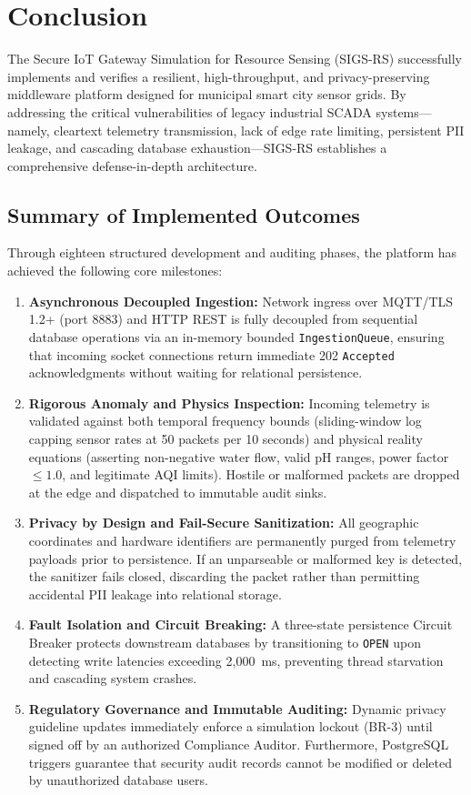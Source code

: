 \section{Conclusion}

The Secure IoT Gateway Simulation for Resource Sensing (SIGS-RS) successfully implements and verifies a resilient, high-throughput, and privacy-preserving middleware platform designed for municipal smart city sensor grids. By addressing the critical vulnerabilities of legacy industrial SCADA systems---namely, cleartext telemetry transmission, lack of edge rate limiting, persistent PII leakage, and cascading database exhaustion---SIGS-RS establishes a comprehensive defense-in-depth architecture.

\subsection{Summary of Implemented Outcomes}
Through eighteen structured development and auditing phases, the platform has achieved the following core milestones:
\begin{enumerate}
    \item \textbf{Asynchronous Decoupled Ingestion:} Network ingress over MQTT/TLS 1.2+ (port 8883) and HTTP REST is fully decoupled from sequential database operations via an in-memory bounded \texttt{IngestionQueue}, ensuring that incoming socket connections return immediate 202 \texttt{Accepted} acknowledgments without waiting for relational persistence.
    \item \textbf{Rigorous Anomaly and Physics Inspection:} Incoming telemetry is validated against both temporal frequency bounds (sliding-window log capping sensor rates at 50 packets per 10 seconds) and physical reality equations (asserting non-negative water flow, valid pH ranges, power factor $\le 1.0$, and legitimate AQI limits). Hostile or malformed packets are dropped at the edge and dispatched to immutable audit sinks.
    \item \textbf{Privacy by Design and Fail-Secure Sanitization:} All geographic coordinates and hardware identifiers are permanently purged from telemetry payloads prior to persistence. If an unparseable or malformed key is detected, the sanitizer fails closed, discarding the packet rather than permitting accidental PII leakage into relational storage.
    \item \textbf{Fault Isolation and Circuit Breaking:} A three-state persistence Circuit Breaker protects downstream databases by transitioning to \texttt{OPEN} upon detecting write latencies exceeding 2,000~ms, preventing thread starvation and cascading system crashes.
    \item \textbf{Regulatory Governance and Immutable Auditing:} Dynamic privacy guideline updates immediately enforce a simulation lockout (BR-3) until signed off by an authorized Compliance Auditor. Furthermore, PostgreSQL triggers guarantee that security audit records cannot be modified or deleted by unauthorized database users.
\end{enumerate}


